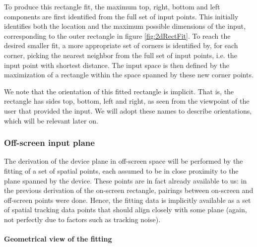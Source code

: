 To produce this rectangle fit, the maximum top, right, bottom and left components are first identified from the full set of input points. This initially identifies both the location and the maximum possible dimensions of the input, corresponding to the outer rectangle in figure \ref{fig:2dRectFit}. To reach the desired smaller fit, a more appropriate set of corners is identified by, for each corner, picking the nearest neighbor from the full set of input points, i.e. the input point with shortest distance. The input space is then defined by the maximization of a rectangle within the space spanned by these new corner points. 

We note that the orientation of this fitted rectangle is implicit. That is, the rectangle has sides top, bottom, left and right, as seen from the viewpoint of the user that provided the input. We will adopt these names to describe orientations, which will be relevant later on.


\subsubsection{Off-screen input plane}

The derivation of the device plane in off-screen space will be performed by the fitting of a set of spatial points, each assumed to be in close proximity to the plane spanned by the device. These points are in fact already available to us: in the previous derivation of the on-screen rectangle, pairings between on-screen and off-screen points were done. Hence, the fitting data is implicitly available as a set of  spatial tracking data points that should align closely with some plane (again, not perfectly due to factors such as tracking noise).%

 
\paragraph{Geometrical view of the fitting}

